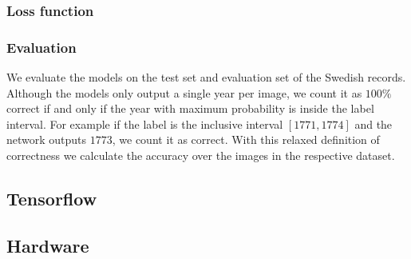 \subsubsection{Loss function}


\subsubsection{Evaluation}

We evaluate the models on the test set and evaluation set of the Swedish records. Although the models only output a single year per image, we count it as $100\%$ correct if and only if the year with maximum probability is inside the label interval. For example if the label is the inclusive interval $[1771, 1774]$ and the network outputs $1773$, we count it as correct. With this relaxed definition of correctness we calculate the accuracy over the images in the respective dataset.


\subsection{Tensorflow}


\subsection{Hardware}
